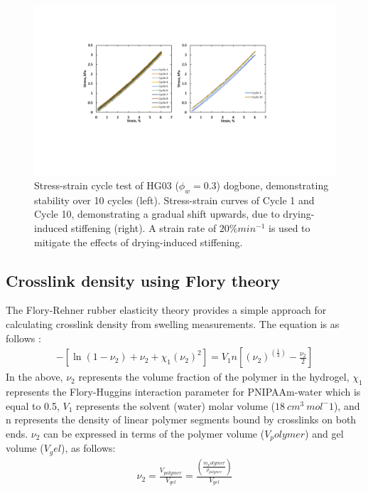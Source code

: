 \begin{figure}[!th]
      \centering
      \includegraphics[width=\textwidth]{stressCycle.pdf}
      \caption{Stress-strain cycle test of HG03 ($\phi_{w}=0.3$) dogbone, demonstrating stability over 10 cycles (left). Stress-strain curves of Cycle 1 and Cycle 10, demonstrating a gradual shift upwards, due to drying-induced stiffening (right). A strain rate of $20\% min^{-1}$ is used to mitigate the effects of drying-induced stiffening.}
      \label{fig:stressCycle}
\end{figure}

\subsection{Crosslink density using Flory theory}
The Flory-Rehner rubber elasticity theory provides a simple approach for calculating crosslink density from swelling measurements. The equation is as follows :
\begin{align}
	-[\ln⁡(1-\nu_2)+\nu_2+\chi_1 (\nu_2 )^2 ]=V_1 n[(\nu_2 )^{(\frac{1}{3})}-\frac{\nu_2}{2}]
\end{align}
In the above, $\nu_{2}$ represents the volume fraction of the polymer in the hydrogel, $\chi_{1}$  represents the Flory-Huggins interaction parameter for PNIPAAm-water  which is equal to 0.5,  $V_{1}$ represents the solvent (water) molar volume ($18~cm^3~mol^-1$), and n represents the density of linear polymer segments bound by crosslinks on both ends. $\nu_{2}$ can be expressed in terms of the polymer volume ($V_polymer$) and gel volume ($V_gel$), as follows:
\begin{align}
	\nu_2=\frac{V_{polymer}}{V_{gel}} =\frac{(\frac{{m_polymer}}{\rho_{polymer}})}{V_{gel}} 
\end{align}

